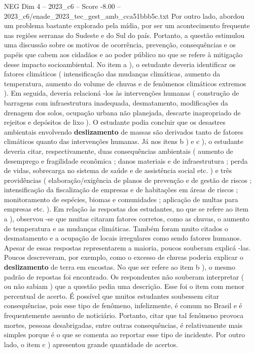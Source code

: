 \begin{textsample}{NEG Dim 4 – 2023\_c6 – Score -8.00 – 2023\_c6/enade\_2023\_tec\_gest\_amb\_cca51bbb5c.txt}
Por outro lado, abordou um problema bastante explorado pela mídia, por ser um acontecimento frequente nas regiões serranas do Sudeste e do Sul do país.
Portanto, a questão estimulou uma discussão sobre os motivos de ocorrência, prevenção, consequências e os papéis que cabem aos cidadãos e ao poder público no que se refere à mitigação desse impacto socioambiental.
No item a ), o estudante deveria identificar os fatores climáticos ( intensificação das mudanças climáticas, aumento da temperatura, aumento do volume de chuvas e de fenômenos climáticos extremos ).
Em seguida, deveria relacioná -los às intervenções humanas ( construção de barragens com infraestrutura inadequada, desmatamento, modificações da drenagem dos solos, ocupação urbana não planejada, descarte inapropriado de rejeitos e depósitos de lixo ).
O estudante podia concluir que os desastres ambientais envolvendo \textbf{deslizamento} de massas são derivados tanto de fatores climáticos quanto das intervenções humanas.
Já nos itens b ) e c ), o estudante deveria citar, respectivamente, duas consequências ambientais ( aumento de desemprego e fragilidade econômica ; danos materiais e de infraestrutura ; perda de vidas, sobrecarga no sistema de saúde e de assistência social etc. ) e três providências ( elaboração/exigência de planos de prevenção e de gestão de riscos ; intensificação da fiscalização de empresas e de habitações em áreas de riscos ; monitoramento de espécies, biomas e comunidades ; aplicação de multas para empresas etc. ).
Em relação às respostas dos estudantes, no que se refere ao item a ), observou -se que muitas citaram fatores corretos, como as chuvas, o aumento de temperatura e as mudanças climáticas.
Também foram muito citados o desmatamento e a ocupação de locais irregulares como sendo fatores humanos.
Apesar de essas respostas representarem a maioria, poucos souberam explicá -las.
Poucos descreveram, por exemplo, como o excesso de chuvas poderia explicar o \textbf{deslizamento} de terra em encostas.
No que ser refere ao item b ), o mesmo padrão de repostas foi encontrado.
Os respondentes não souberam interpretar ( ou não sabiam ) que a questão pedia uma descrição.
Esse foi o item com menor percentual de acerto.
É possível que muitos estudantes soubessem citar consequências, pois esse tipo de fenômeno, infelizmente, é comum no Brasil e é frequentemente assunto de noticiário.
Portanto, citar que tal fenômeno provoca mortes, pessoas desabrigadas, entre outras consequências, é relativamente mais simples porque é o que se comenta ao reportar esse tipo de incidente.
Por outro lado, o item c ) apresentou grande quantidade de acertos.

\end{textsample}

